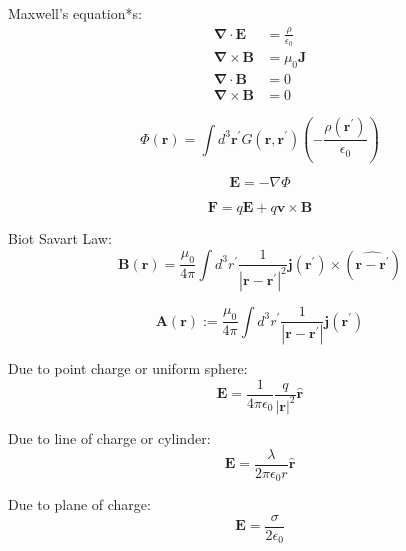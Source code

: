 \documentclass[a4paper, twocolumn]{article}
\renewcommand{\vec}[1]{\boldsymbol{#1}}
\begin{document}
\footnotesize

Maxwell's equation*s:
\begin{align*}
    \vec{\nabla} \cdot \vec{E} &= \frac{\rho}{\epsilon_{0}} \\
    \vec{\nabla} \times \vec{B} &= \mu_{0} \vec{J} \\
    \vec{\nabla} \cdot \vec{B} &= 0 \\
    \vec{\nabla} \times \vec{B} &= 0
\end{align*}

\begin{equation*}
    \Phi(\vec{r}) = \int d^{3} \vec{r}^{\prime} G(\vec{r}, \vec{r}^{\prime}) \left( - \frac{\rho(\vec{r}^{\prime})}{\epsilon_{0}}\right)
\end{equation*}

\begin{equation*}
    \vec{E} = - \nabla \Phi
\end{equation*}

\begin{equation*}
    \vec{F} = q\vec{E} + q\vec{v} \times \vec{B}
\end{equation*}


Biot Savart Law:
\begin{equation*}
    \vec{B}(\vec{r}) = \frac{\mu_0}{4 \pi} \int d^{3}r^{\prime} \frac{1}{| \vec{r} - \vec{r}^{\prime}|^{2}} \vec{j}(\vec{r}^{\prime}) \times (\hat{\vec{r} - \vec{r}^{\prime}})
\end{equation*}

\begin{equation*}
    \vec{A}(\vec{r}) := \frac{\mu_{0}}{4 \pi} \int d^{3} r^{\prime} \frac{1}{| \vec{r} - \vec{r}^{\prime}|} \vec{j}(\vec{r}^{\prime})
\end{equation*}

Due to point charge or uniform sphere:
\begin{equation*}
    \vec{E} = \frac{1}{4 \pi \epsilon_{0}} \frac{q}{|\vec{r}|^2} \hat{\vec{r}}
\end{equation*}

Due to line of charge or cylinder:
\begin{equation*}
    \vec{E} = \frac{\lambda}{2 \pi \epsilon_{0} r} \hat{\vec{r}}
\end{equation*}

Due to plane of charge:
\begin{equation*}
    \vec{E} = \frac{\sigma}{2 \epsilon_{0}}
\end{equation*}
\end{document}
